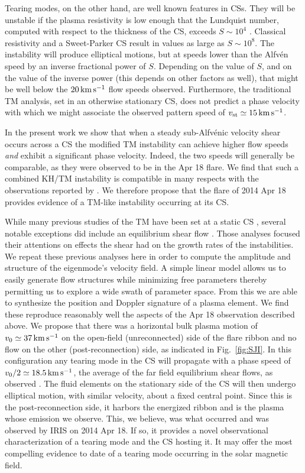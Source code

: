 Tearing modes, on the other hand, are well known features in CSs.  They will be unstable if the plasma resistivity is low enough that the Lundquist number, computed with respect to the thickness of the CS, exceeds $S\sim10^4$ \citep{Biskamp1986}.  Classical resistivity and a Sweet-Parker CS result in values as large as $S\sim10^8$.  The instability will produce elliptical motions, but at speeds lower than the Alfv\'en speed by an inverse fractional power of $S$.  Depending on the value of $S$, and on the value of the inverse power (this depends on other factors as well), that might be well below the $20\,{\rm km\, s^{-1}}$ flow speeds observed.  Furthermore, the traditional {T}M analysis, set in an otherwise stationary CS, does not predict a phase velocity with which we might associate the observed pattern speed of $v_{\rm st}\simeq15\,{\rm km\,s^{-1}}$.  

In the present work we show that when a steady sub-Alfv\'enic velocity shear occurs across a CS the modified {T}M instability can achieve higher flow speeds {\em and} exhibit a significant phase velocity.  Indeed, the two speeds will generally be comparable, as they were observed to be in the Apr 18 flare.  We find that such a combined KH/{T}M instability is compatible in many respects with the observations reported by \BLQ.  We therefore propose that the flare of 2014 Apr 18 provides evidence of a {T}M-like instability occurring at its CS.

While many previous studies of the {T}M have been set at a static CS \citep{Furth1963,Steinolfson1983,Velli1989,Pucci2014}, several notable exceptions did include an equilibrium shear flow
\citep{Einaudi1986,Ofman1991,Offman1993,Chen1997,Li2010,Zhang2011,Doss2015}.  Those analyses focused their attentions on effects the shear had on the growth rates of the instabilities.  We repeat these previous analyses here in order to compute the amplitude and structure of the eigenmode's velocity field. A simple linear model allows us to easily generate flow structures while minimizing free parameters thereby permitting us to explore a wide swath of parameter space.  From this we are able to synthesize the position and Doppler signature of a plasma element.  We find these reproduce reasonably well the aspects of the Apr 18 observation described above.  We propose that there was a horizontal bulk plasma motion of $v_0\simeq37\,{\rm km\,s^{-1}}$ on the open-field (unreconnected) side of the flare ribbon and no flow on the other (post-reconnection) side, as indicated in Fig.\ \ref{fig:SJI}.  In this configuration any tearing mode in the CS will propagate with a phase speed of $v_0/2\simeq 18.5\,{\rm km\,s^{-1}}$, the average of the far field equilibrium shear flows, as observed \citep{Doss2015}.  The fluid elements on the stationary side of the CS will then undergo elliptical motion, with similar velocity, about a fixed central point.  Since this is the post-reconnection side, it harbors the energized ribbon and is the plasma whose emission we observe.  This, we believe, was what occurred and was observed by IRIS on 2014 Apr 18.  If so, it provides a novel observational characterization of a tearing mode and the CS hosting it.  It may offer the most compelling evidence to date of a tearing mode occurring in the solar magnetic field.

